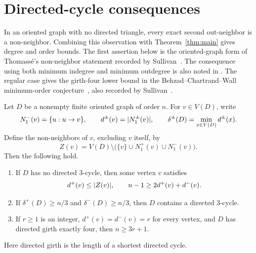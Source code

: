 \section{Directed-cycle consequences}\label{sec:directed-cycle-consequences}

In an oriented graph with no directed triangle, every exact second
out-neighbor is a non-neighbor.  Combining this observation with
Theorem~\ref{thm:main} gives degree and order bounds.
The first assertion below is the oriented-graph form of Thomass\'e's
non-neighbor statement recorded by
Sullivan~\cite[Conjecture~6.12]{Sullivan2006}.
The consequence using both minimum indegree and minimum outdegree is also
noted in \cite[Section~3]{Sullivan2006}.  The regular case gives the
girth-four lower bound in the Behzad--Chartrand--Wall minimum-order
conjecture~\cite{BehzadChartrandWall1970}, also recorded by
Sullivan~\cite[Section~4]{Sullivan2006}.

\begin{corollary}\label{cor:directed-cycle-consequences}
Let \(D\) be a nonempty finite oriented graph of order \(n\).  For
\(v\in V(D)\), write
\[
 N_1^-(v)=\{u:u\to v\},\qquad
 d^\pm(v)=\lvert N_1^\pm(v)\rvert,\qquad
 \delta^\pm(D)=\min_{x\in V(D)}d^\pm(x).
\]
Define the non-neighbors of \(v\), excluding \(v\) itself, by
\[
 Z(v)=V(D)\setminus
 \bigl(\{v\}\cup N_1^+(v)\cup N_1^-(v)\bigr).
\]
Then the following hold.
\begin{enumerate}[label=\textup{(\roman*)}]
\item If \(D\) has no directed \(3\)-cycle, then some vertex \(v\) satisfies
\[
 d^+(v)\leq\lvert Z(v)\rvert,\qquad
 n-1\geq 2d^+(v)+d^-(v).
\]
\item If \(\delta^+(D)\geq n/3\) and \(\delta^-(D)\geq n/3\), then \(D\)
contains a directed \(3\)-cycle.
\item If \(r\geq1\) is an integer, \(d^+(v)=d^-(v)=r\) for every vertex,
and \(D\) has directed girth exactly four, then \(n\geq3r+1\).
\end{enumerate}
Here directed girth is the length of a shortest directed cycle.
\end{corollary}

